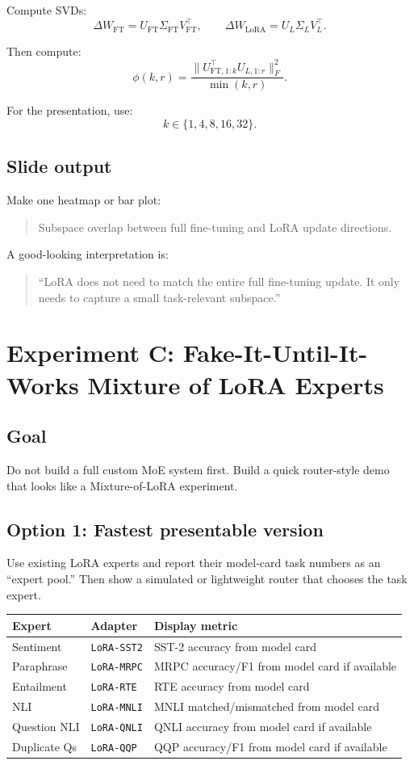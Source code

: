 \documentclass[11pt]{article}
\begin{document}
Compute SVDs:
\[
\Delta W_{\mathrm{FT}} = U_{\mathrm{FT}}\Sigma_{\mathrm{FT}}V_{\mathrm{FT}}^\top,
\qquad
\Delta W_{\mathrm{LoRA}} = U_L\Sigma_LV_L^\top.
\]

Then compute:
\[
\phi(k,r) =
\frac{\|U_{\mathrm{FT},1:k}^\top U_{L,1:r}\|_F^2}{\min(k,r)}.
\]

For the presentation, use:
\[
k \in \{1,4,8,16,32\}.
\]

\subsection{Slide output}

Make one heatmap or bar plot:
\begin{quote}
Subspace overlap between full fine-tuning and LoRA update directions.
\end{quote}

A good-looking interpretation is:
\begin{quote}
``LoRA does not need to match the entire full fine-tuning update. It only needs to capture a small task-relevant subspace.''
\end{quote}

\section{Experiment C: Fake-It-Until-It-Works Mixture of LoRA Experts}

\subsection{Goal}

Do not build a full custom MoE system first. Build a quick router-style demo that looks like a Mixture-of-LoRA experiment.

\subsection{Option 1: Fastest presentable version}

Use existing LoRA experts and report their model-card task numbers as an ``expert pool.'' Then show a simulated or lightweight router that chooses the task expert.

\begin{center}
\begin{tabular}{@{}lll@{}}
\toprule
Expert & Adapter & Display metric \\
\midrule
Sentiment & \texttt{LoRA-SST2} & SST-2 accuracy from model card \\
Paraphrase & \texttt{LoRA-MRPC} & MRPC accuracy/F1 from model card if available \\
Entailment & \texttt{LoRA-RTE} & RTE accuracy from model card \\
NLI & \texttt{LoRA-MNLI} & MNLI matched/mismatched from model card \\
Question NLI & \texttt{LoRA-QNLI} & QNLI accuracy from model card if available \\
Duplicate Qs & \texttt{LoRA-QQP} & QQP accuracy/F1 from model card if available \\
\bottomrule
\end{tabular}
\end{center}
\end{document}
